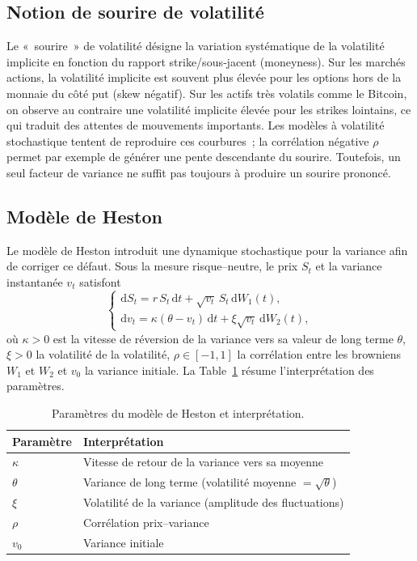 \documentclass[12pt,a4paper]{article}
\begin{document}
\subsection{Notion de sourire de volatilité}

Le « sourire » de volatilité désigne la variation systématique de la volatilité implicite en fonction du rapport strike/sous‑jacent (moneyness).  Sur les marchés actions, la volatilité implicite est souvent plus élevée pour les options hors de la monnaie du côté put (skew négatif).  Sur les actifs très volatils comme le Bitcoin, on observe au contraire une volatilité implicite élevée pour les strikes lointains, ce qui traduit des attentes de mouvements importants.  Les modèles à volatilité stochastique tentent de reproduire ces courbures ; la corrélation négative $\rho$ permet par exemple de générer une pente descendante du sourire.  Toutefois, un seul facteur de variance ne suffit pas toujours à produire un sourire prononcé.

\subsection{Modèle de Heston}

Le modèle de Heston introduit une dynamique stochastique pour la variance afin de corriger ce défaut.  Sous la mesure risque--neutre, le prix $S_t$ et la variance instantanée $v_t$ satisfont
\begin{equation}
\begin{cases}
  \mathrm{d}S_t = r \, S_t \, \mathrm{d}t + \sqrt{v_t}\,S_t\,\mathrm{d}W_1(t),\\
  \mathrm{d}v_t = \kappa(\theta - v_t) \, \mathrm{d}t + \xi \sqrt{v_t} \, \mathrm{d}W_2(t),
\end{cases}
\end{equation}
où $\kappa>0$ est la vitesse de réversion de la variance vers sa valeur de long terme $\theta$, $\xi>0$ la volatilité de la volatilité, $\rho\in [-1,1]$ la corrélation entre les browniens $W_1$ et $W_2$ et $v_0$ la variance initiale.  La Table~\ref{tab:params} résume l'interprétation des paramètres.

\begin{table}[h]
  \centering
  \begin{tabular}{ll}
    \toprule
    Paramètre & Interprétation \\ \midrule
    $\kappa$ & Vitesse de retour de la variance vers sa moyenne \\
    $\theta$ & Variance de long terme (volatilité moyenne $=\sqrt{\theta}$) \\
    $\xi$ & Volatilité de la variance (amplitude des fluctuations) \\
    $\rho$ & Corrélation prix--variance \\
    $v_0$ & Variance initiale \\
    \bottomrule
  \end{tabular}
  \caption{Paramètres du modèle de Heston et interprétation.}
  \label{tab:params}
\end{table}
\end{document}
